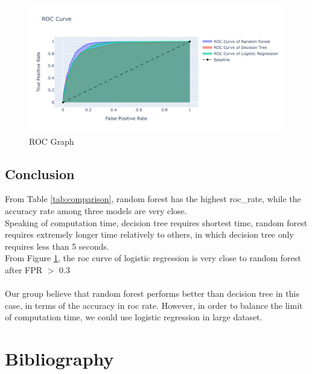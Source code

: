 \documentclass[11pt,a4paper]{article}
\begin{document}

    
    \begin{figure}[H]
        \centering
        \includegraphics[width = \textwidth]{plot/classification/roc.pdf}
        \caption{ROC Graph}
        \label{fig:roc}
    \end{figure}

    
    
    \subsection{Conclusion}
    From Table \ref{tab:comparison}, random forest has the highest roc\_rate, while the accuracy rate among three models are very close. \\
    Speaking of computation time, decision tree requires shortest time, random forest requires extremely longer time relatively to others, in which decision tree only requires less than 5 seconds. \\
    From Figure \ref{fig:roc}, the roc curve of logistic regression is very close to random forest after FPR $>$ 0.3 \\
    \\
    Our group believe that random forest performs better than decision tree in this case, in terms of the accuracy in roc rate. However, in order to balance the limit of computation time, we could use logistic regression in large dataset.
    
    
    \newpage
    \section{Bibliography}
    
\end{document}
